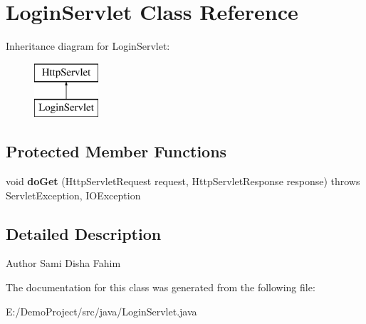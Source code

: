 \section{Login\+Servlet Class Reference}
\label{class_login_servlet}
Inheritance diagram for Login\+Servlet\+:\begin{figure}[H]
\begin{center}
\leavevmode
\includegraphics[height=2.000000cm]{class_login_servlet}
\end{center}
\end{figure}
\subsection*{Protected Member Functions}
\begin{DoxyCompactItemize}
\item 
\mbox{\label{class_login_servlet_aa6cc9b9eda96e8cfd1056b1276d55463}} 
void {\bfseries do\+Get} (Http\+Servlet\+Request request, Http\+Servlet\+Response response)  throws Servlet\+Exception, I\+O\+Exception 
\end{DoxyCompactItemize}


\subsection{Detailed Description}
\begin{DoxyAuthor}{Author}
Sami Disha Fahim 
\end{DoxyAuthor}


The documentation for this class was generated from the following file\+:\begin{DoxyCompactItemize}
\item 
E\+:/\+Demo\+Project/src/java/Login\+Servlet.\+java\end{DoxyCompactItemize}
